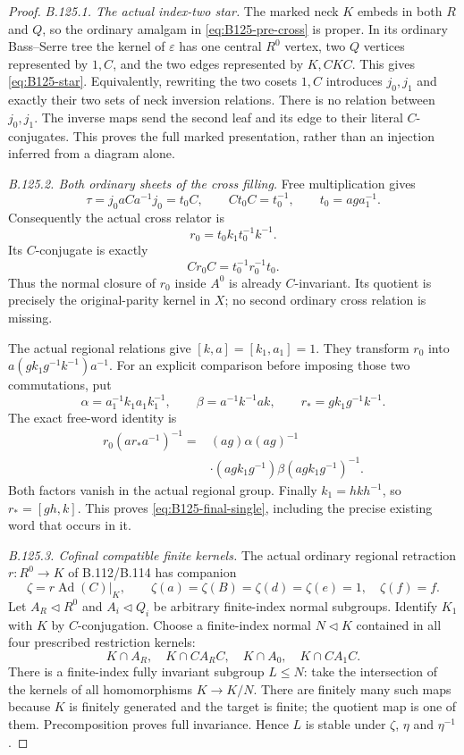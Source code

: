\begin{proof}
\emph{B.125.1. The actual index-two star.}
The marked neck $K$ embeds in both $R$ and $Q$, so the ordinary
amalgam in \eqref{eq:B125-pre-cross} is proper. In its ordinary
Bass--Serre tree the kernel of $\varepsilon$ has one central
$R^0$ vertex, two $Q$ vertices represented by $1,C$, and the two
edges represented by $K,CKC$. This gives
\eqref{eq:B125-star}. Equivalently, rewriting the two cosets
$1,C$ introduces $j_0,j_1$ and exactly their two sets of neck
inversion relations. There is no relation between $j_0,j_1$.
The inverse maps send the second leaf and its edge to their literal
$C$-conjugates. This proves the full marked presentation, rather
than an injection inferred from a diagram alone.

\emph{B.125.2. Both ordinary sheets of the cross filling.}
Free multiplication gives
\[
 \tau=j_0aCa^{-1}j_0=t_0C,\qquad
 Ct_0C=t_0^{-1},\qquad t_0=a g a_1^{-1}.
\]
Consequently the actual cross relator is
\[
 r_0=t_0k_1t_0^{-1}k^{-1}.
\]
Its $C$-conjugate is exactly
\begin{equation}\label{eq:B125-two-sheet}
 Cr_0C=t_0^{-1}r_0^{-1}t_0.
\end{equation}
Thus the normal closure of $r_0$ inside $A^0$ is already
$C$-invariant. Its quotient is precisely the original-parity
kernel in $X$; no second ordinary cross relation is missing.

The actual regional relations give $[k,a]=[k_1,a_1]=1$.
They transform $r_0$ into $a(gk_1g^{-1}k^{-1})a^{-1}$.
For an explicit comparison before imposing those two commutations,
put
\[
 \alpha=a_1^{-1}k_1a_1k_1^{-1},\qquad
 \beta=a^{-1}k^{-1}ak,
 \qquad r_*=gk_1g^{-1}k^{-1}.
\]
The exact free-word identity is
\begin{equation}\label{eq:B125-relator-difference}
 \begin{split}
 r_0(ar_*a^{-1})^{-1}
  ={}&(ag)\alpha(ag)^{-1}\\
     &\cdot(agk_1g^{-1})\beta(agk_1g^{-1})^{-1}.
 \end{split}
\end{equation}
Both factors vanish in the actual regional group. Finally
$k_1=hkh^{-1}$, so $r_*=[gh,k]$. This proves
\eqref{eq:B125-final-single}, including the precise existing word
that occurs in it.

\emph{B.125.3. Cofinal compatible finite kernels.}
The actual ordinary regional retraction $r:R^0\to K$ of
B.112/B.114 has companion
\[
 \zeta=r\operatorname{Ad}(C)|_K,\qquad
 \zeta(a)=\zeta(B)=\zeta(d)=\zeta(e)=1,
 \quad \zeta(f)=f.
\]
Let $A_R\triangleleft R^0$ and $A_i\triangleleft Q_i$ be
arbitrary finite-index normal subgroups. Identify $K_1$ with $K$
by $C$-conjugation. Choose a finite-index normal $N\triangleleft K$
contained in all four prescribed restriction kernels:
\[
 K\cap A_R,\quad K\cap CA_RC,\quad K\cap A_0,
 \quad K\cap CA_1C.
\]
There is a finite-index fully invariant subgroup $L\leq N$:
take the intersection of the kernels of all homomorphisms
$K\to K/N$. There are finitely many such maps because $K$ is
finitely generated and the target is finite; the quotient map is
one of them. Precomposition proves full invariance. Hence $L$ is
stable under $\zeta$, $\eta$ and $\eta^{-1}$.


\end{proof}
